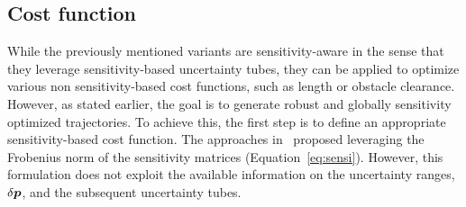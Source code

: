 
\subsection{Cost function}\label{sec:sensi_cost}

While the previously mentioned  variants are sensitivity-aware in the sense that they leverage sensitivity-based uncertainty tubes, they can be applied to optimize various non sensitivity-based cost functions, such as length or obstacle clearance.
However, as stated earlier, the goal is to generate robust and globally sensitivity optimized trajectories.
To achieve this, the first step is to define an appropriate sensitivity-based cost function.
The approaches in~\cite{cPi, cTh} proposed leveraging the Frobenius norm of the sensitivity matrices (Equation~\ref{eq:sensi}).
However, this formulation does not exploit the available information on the uncertainty ranges, $\delta \boldsymbol{p}$, and the subsequent uncertainty tubes.

